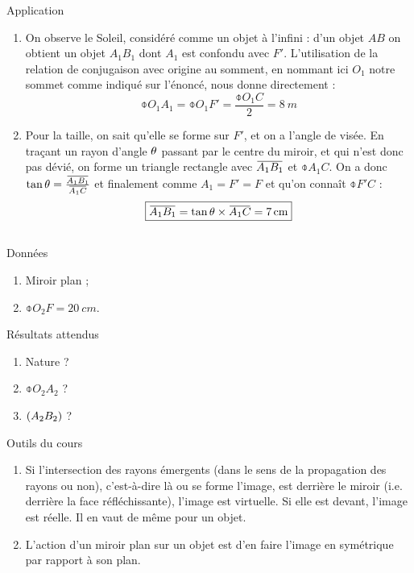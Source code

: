 \documentclass[10pt,a5paper,notitlepage]{book}
\begin{document}
\begin{NCexem}{Application}
    \begin{enumerate}
        \item On observe le Soleil, considéré comme un objet à l'infini : d'un
            objet $AB$ on obtient un objet $A_1B_1$ dont $A_1$ est confondu avec
            $F'$.  L'utilisation de la relation de conjugaison avec origine au
            somment, en nommant ici $O_1$ notre sommet comme indiqué sur
            l'énoncé, nous donne directement : \[ \boxed{\obar{O_1A_1} =
            \obar{O_1F'} = \frac{\obar{O_1C}}{2} = \SI{8}{m}} \]

        \item Pour la taille, on sait qu'elle se forme sur $F'$, et on a l'angle
            de visée. En traçant un rayon d'angle $\theta$ passant par le centre du
            miroir, et qui n'est donc pas dévié, on forme un triangle rectangle
            avec $\ABa$ et $\obar{A_1C}$. On a donc $\tan\t =
            \frac{\ABa}{\obar{A_1C}}$ et finalement comme $A_1 = F' = F$ et
            qu'on connaît $\obar{F'C}$ :
            \[ \boxed{\ABa = \tan\t\times\obar{A_1C} = \SI{7}{cm}} \]
    \end{enumerate}
\end{NCexem}

\subsection{}

\begin{NCdefi}{Données}
    \begin{enumerate}
        \item Miroir plan ;
        \item $\obar{O_2F} = \SI{20}{cm}$.
    \end{enumerate}
\end{NCdefi}

\begin{NCprop}{Résultats attendus}
    \begin{enumerate}
        \item Nature ?
        \item $\obar{O_2A_2}$ ?
        \item $\left(A_2B_2\right)$ ?
    \end{enumerate}
\end{NCprop}

\begin{NCdemo}{Outils du cours}
    \begin{enumerate}
        \item Si l'intersection des rayons émergents (dans le sens de la
            propagation des rayons ou non), c'est-à-dire là ou se forme l'image,
            est derrière le miroir (i.e. derrière la face réfléchissante),
            l'image est virtuelle. Si elle est devant, l'image est réelle. Il en
            vaut de même pour un objet.
        \item L'action d'un miroir plan sur un objet est d'en faire l'image en
            symétrique par rapport à son plan.
    \end{enumerate}
\end{NCdemo}
\end{document}
